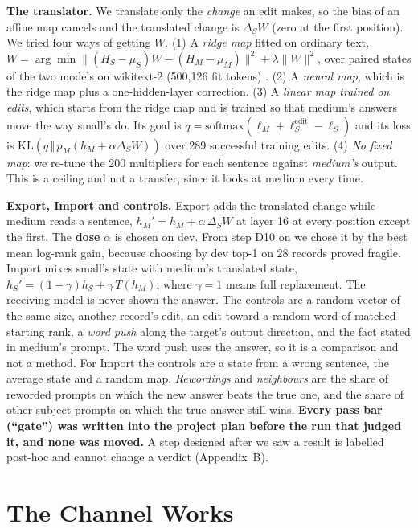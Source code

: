 \textbf{The translator.} We translate only the \emph{change} an edit makes, so the bias of an affine map cancels and the translated change is $\Delta_S W$ (zero at the first position). We tried four ways of getting $W$. (1) A \emph{ridge map} fitted on ordinary text, $W=\arg\min\lVert(H_S-\mu_S)W-(H_M-\mu_M)\rVert^2+\lambda\lVert W\rVert^2$, over paired states of the two models on wikitext-2 (500,126 fit tokens) \cite{r45}. (2) A \emph{neural map}, which is the ridge map plus a one-hidden-layer correction. (3) A \emph{linear map trained on edits}, which starts from the ridge map and is trained so that medium's answers move the way small's do. Its goal is $q=\mathrm{softmax}(\ell_M+\ell_S^{\mathrm{edit}}-\ell_S)$ and its loss is $\mathrm{KL}(q\,\Vert\,p_M(h_M+\alpha\Delta_SW))$ over 289 successful training edits. (4) \emph{No fixed map}: we re-tune the 200 multipliers for each sentence against \emph{medium's} output. This is a ceiling and not a transfer, since it looks at medium every time.

\textbf{Export, Import and controls.} Export adds the translated change while medium reads a sentence, $h_M'=h_M+\alpha\,\Delta_S W$ at layer 16 at every position except the first. The \textbf{dose} $\alpha$ is chosen on dev. From step D10 on we chose it by the best mean log-rank gain, because choosing by dev top-1 on 28 records proved fragile. Import mixes small's state with medium's translated state, $h_S'=(1-\gamma)h_S+\gamma\,T(h_M)$, where $\gamma=1$ means full replacement. The receiving model is never shown the answer. The controls are a random vector of the same size, another record's edit, an edit toward a random word of matched starting rank, a \emph{word push} along the target's output direction, and the fact stated in medium's prompt. The word push uses the answer, so it is a comparison and not a method. For Import the controls are a state from a wrong sentence, the average state and a random map. \emph{Rewordings} and \emph{neighbours} are the share of reworded prompts on which the new answer beats the true one, and the share of other-subject prompts on which the true answer still wins. \textbf{Every pass bar (``gate'') was written into the project plan before the run that judged it, and none was moved.} A step designed after we saw a result is labelled post-hoc and cannot change a verdict (Appendix~B).

\section{The Channel Works}\label{sec:channel}

